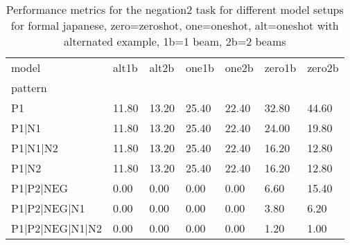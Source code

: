 \begin{table}[h]
\begin{tabular}{l|llllll}
\toprule
model & alt1b & alt2b & one1b & one2b & zero1b & zero2b \\
pattern &  &  &  &  &  &  \\
\midrule
P1 & 11.80 & 13.20 & 25.40 & 22.40 & 32.80 & 44.60 \\
P1|N1 & 11.80 & 13.20 & 25.40 & 22.40 & 24.00 & 19.80 \\
P1|N1|N2 & 11.80 & 13.20 & 25.40 & 22.40 & 16.20 & 12.80 \\
P1|N2 & 11.80 & 13.20 & 25.40 & 22.40 & 16.20 & 12.80 \\
P1|P2|NEG & 0.00 & 0.00 & 0.00 & 0.00 & 6.60 & 15.40 \\
P1|P2|NEG|N1 & 0.00 & 0.00 & 0.00 & 0.00 & 3.80 & 6.20 \\
P1|P2|NEG|N1|N2 & 0.00 & 0.00 & 0.00 & 0.00 & 1.20 & 1.00 \\
\bottomrule
\end{tabular}
\caption{Performance metrics for the negation2 task for different model setups for formal japanese, zero=zeroshot, one=oneshot, alt=oneshot with alternated example, 1b=1 beam, 2b=2 beams}
\label{tab:ja form_negation2_performance}
\end{table}
